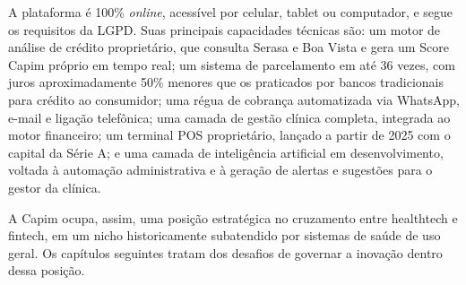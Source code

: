 A plataforma é 100\% \textit{online}, acessível por celular, tablet ou computador, e segue os requisitos da LGPD. Suas principais capacidades técnicas são: um motor de análise de crédito proprietário, que consulta Serasa e Boa Vista e gera um Score Capim próprio em tempo real; um sistema de parcelamento em até 36 vezes, com juros aproximadamente 50\% menores que os praticados por bancos tradicionais para crédito ao consumidor; uma régua de cobrança automatizada via WhatsApp, e-mail e ligação telefônica; uma camada de gestão clínica completa, integrada ao motor financeiro; um terminal POS proprietário, lançado a partir de 2025 com o capital da Série A; e uma camada de inteligência artificial em desenvolvimento, voltada à automação administrativa e à geração de alertas e sugestões para o gestor da clínica.

A Capim ocupa, assim, uma posição estratégica no cruzamento entre healthtech e fintech, em um nicho historicamente subatendido por sistemas de saúde de uso geral. Os capítulos seguintes tratam dos desafios de governar a inovação dentro dessa posição.
